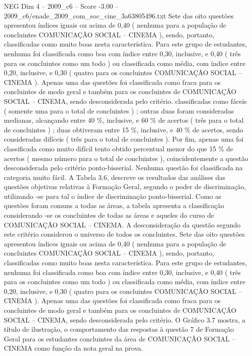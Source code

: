 \begin{textsample}{NEG Dim 4 – 2009\_c6 – Score -3.00 – 2009\_c6/enade\_2009\_com\_soc\_cine\_3a63805496.txt}
Sete das oito questões apresentou índices iguais ou acima de 0,40 ( nenhuma para a população de concluintes COMUNICAÇÃO SOCIAL – CINEMA ), sendo, portanto, classificadas como muito boas nesta característica.
Para este grupo de estudantes, nenhuma foi classificada como boa com índice entre 0,30, inclusive, e 0,40 ( três para os concluintes como um todo ) ou classificada como média, com índice entre 0,20, inclusive, e 0,30 ( quatro para os concluintes COMUNICAÇÃO SOCIAL – CINEMA ).
Apenas uma das questões foi classificada como fraca para os concluintes de modo geral e também para os concluintes de COMUNICAÇÃO SOCIAL – CINEMA, sendo desconsiderada pelo critério. classificadas como fáceis ( somente uma para o total de concluintes ) ; outras duas foram consideradas medianas, alcançando entre 40 \%, inclusive, e 60 \% de acertos ( três para o total de concluintes ) ; duas obtiveram entre 15 \%, inclusive, e 40 \% de acertos, sendo consideradas difíceis ( três para o total de concluintes ).
Por fim, apenas uma foi classificada como muito difícil tento obtido percentual menor do que 15 \% de acertos ( mesmo número para o total de concluintes ), coincidentemente a questão desconsiderada pelo critério ponto-bisserial.
Nenhuma questão foi classificada na categoria muito fácil.
A Tabela 3.6, descreve os resultados das análises das questões objetivas relativas à Formação Geral, segundo o poder de discriminação, utilizando -se para tal o índice de discriminação ponto-bisserial.
Como as questões foram comuns a todas as áreas, a tabela apresenta a classificação considerando -se os concluintes de todas as áreas e aqueles do curso de COMUNICAÇÃO SOCIAL – CINEMA.
A desconsideração da questão segundo este critério considerou o universo de todos os concluintes.
Sete das oito questões apresentou índices iguais ou acima de 0,40 ( nenhuma para a população de concluintes COMUNICAÇÃO SOCIAL – CINEMA ), sendo, portanto, classificadas como muito boas nesta característica.
Para este grupo de estudantes, nenhuma foi classificada como boa com índice entre 0,30, inclusive, e 0,40 ( três para os concluintes como um todo ) ou classificada como média, com índice entre 0,20, inclusive, e 0,30 ( quatro para os concluintes COMUNICAÇÃO SOCIAL – CINEMA ).
Apenas uma das questões foi classificada como fraca para os concluintes de modo geral e também para os concluintes de COMUNICAÇÃO SOCIAL – CINEMA, sendo desconsiderada pelo critério.
O Gráfico 3.7 mostra, a título de ilustração, o comportamento das respostas à questão 7 de Formação Geral para os estudantes concluintes da área de COMUNICAÇÃO SOCIAL – CINEMA como função da nota geral na prova.

\end{textsample}
